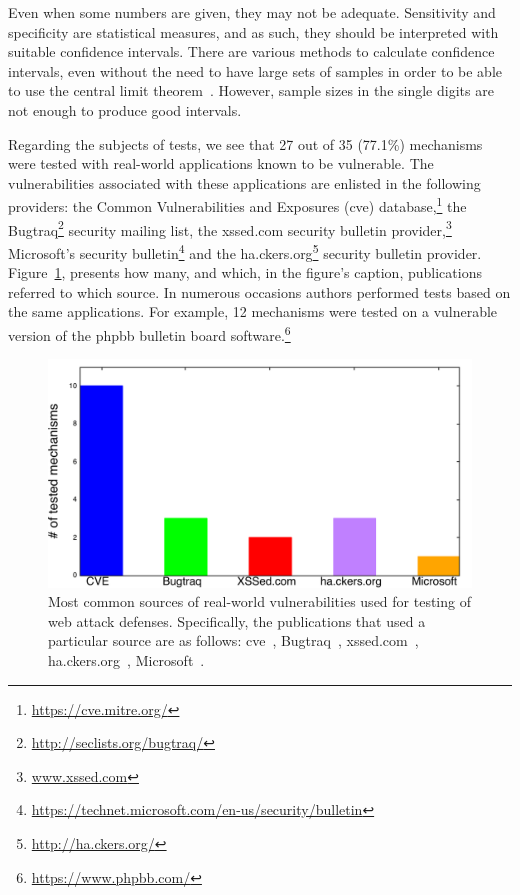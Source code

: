 \documentclass[10pt,journal,compsoc]{IEEEtran}
\begin{document}
Even when some numbers are given, they may not be adequate.
Sensitivity and specificity are statistical measures, and as such,
they should be interpreted with suitable confidence intervals. There are
various methods to calculate confidence intervals, even without
the need to have large sets of samples in order to be able to use the
central limit theorem~\cite{agresti1998,brown2001}.
However, sample sizes in the single
digits are not enough to produce good intervals.

Regarding the subjects of tests,
we see that 27 out of 35 (77.1\%)
mechanisms were tested with real-world
applications known to be vulnerable.
The vulnerabilities associated with these applications
are enlisted in the following providers: the Common
Vulnerabilities and Exposures ({\sc cve})
database,\footnote{\scriptsize\url{https://cve.mitre.org/}}
the Bugtraq\footnote{\scriptsize\url{http://seclists.org/bugtraq/}}
security mailing list,
the {\sc xss}ed.com
security bulletin provider,\footnote{\scriptsize\url{www.xssed.com}}
Microsoft's security
bulletin\footnote{\scriptsize\url{https://technet.microsoft.com/en-us/security/bulletin}}
and the
ha.ckers.org\footnote{\scriptsize\url{http://ha.ckers.org/}}
security bulletin provider.
Figure~\ref{fig:defect_sources},
presents how many,
and which, in the figure's caption, publications referred
to which source.
In numerous occasions authors performed tests based
on the same applications.
For example, 12 mechanisms were tested on a
vulnerable version of the {\sc phpbb} bulletin board
software.\footnote{\scriptsize\url{https://www.phpbb.com/}}

\begin{figure}[t]
\begin{center}
\leavevmode
\includegraphics[scale=0.39]{barchart.pdf}
\end{center}
\caption{\label{fig:defect_sources}Most common sources of real-world vulnerabilities
used for testing of web attack defenses.
Specifically, the publications that used a particular source are as follows:
{\sc cve}~\cite{XBS06,NLC07,PMP11,BK04,BV08,JB07,SMS13,WPLKK09,JKK06a,PS11},
Bugtraq~\cite{PB05,KKVJ06,JEP08},
{\sc xss}ed.com~\cite{NSS06,APKLM10},
ha.ckers.org~\cite{TNH07,PSC09,LV09},
Microsoft~\cite{RDWDE07}.}
\end{figure}
\end{document}
